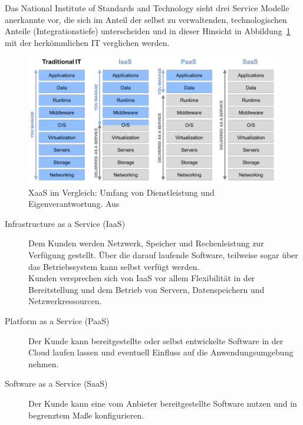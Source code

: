 Das National Institute of Standards and Technology sieht drei 
Service Modelle anerkannte vor, die sich im Anteil der 
selbst zu verwaltenden, technologischen Anteile (Integrationstiefe) 
unterscheiden und in dieser Hinsicht in Abbildung~\ref{fig:xaas_im_vergleich} 
mit der herkömmlichen IT verglichen werden.  \\
\begin{figure}%
\begin{center}
\includegraphics[width=\textwidth]{images/XaaS_im_Vergleich.png}
\caption{XaaS im Vergleich: Umfang von 
Dienstleistung und Eigenverantwortung. Aus 
\protect{} }
\label{fig:xaas_im_vergleich}
\end{center}
\end{figure}
\begin{description}
	\item[Infrastructure as a Service (IaaS)] Dem Kunden werden Netzwerk, 
Speicher und Rechenleistung zur Verfügung gestellt. Über die darauf laufende 
Software, teilweise sogar über das Betriebssystem kann selbst verfügt werden. \\
Kunden versprechen sich von IaaS vor allem Flexibilität in der Bereitstellung 
und dem Betrieb von Servern, Datenspeichern und Netzwerkressourcen. 
	\item[Platform as a Service (PaaS)] Der Kunde kann bereitgestellte 
oder selbst entwickelte Software in der Cloud laufen lassen und eventuell 
Einfluss auf die Anwendungsumgebung nehmen. \\
	\item[Software as a Service (SaaS)] Der Kunde kann eine vom Anbieter 
bereitgestellte Software nutzen und in begrenztem Maße konfigurieren.
\end{description}




